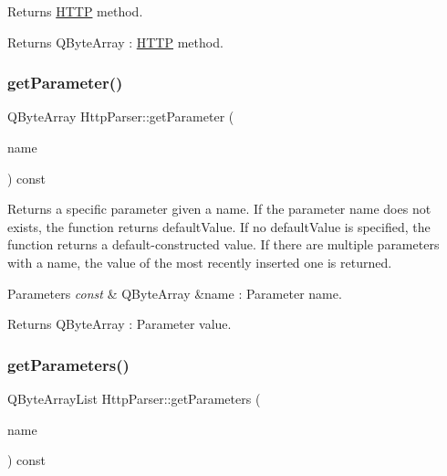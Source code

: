 Returns \hyperlink{namespace_h_t_t_p}{H\+T\+TP} method. 

\begin{DoxyReturn}{Returns}
Q\+Byte\+Array \+: \hyperlink{namespace_h_t_t_p}{H\+T\+TP} method. 
\end{DoxyReturn}
\mbox{\label{class_http_parser_a69fb981ff2f60058277c51b674006663}} 
\subsubsection{\texorpdfstring{get\+Parameter()}{getParameter()}}
{\footnotesize\ttfamily Q\+Byte\+Array Http\+Parser\+::get\+Parameter (\begin{DoxyParamCaption}\item[{const Q\+Byte\+Array \&}]{name }\end{DoxyParamCaption}) const}



Returns a specific parameter given a name. If the parameter name does not exists, the function returns default\+Value. If no default\+Value is specified, the function returns a default-\/constructed value. If there are multiple parameters with a name, the value of the most recently inserted one is returned. 


\begin{DoxyParams}{Parameters}
{\em const} & Q\+Byte\+Array \&name \+: Parameter name. \\
\hline
\end{DoxyParams}
\begin{DoxyReturn}{Returns}
Q\+Byte\+Array \+: Parameter value. 
\end{DoxyReturn}
\mbox{\label{class_http_parser_ab0bb302010df956a954fada3061f59f0}} 
\subsubsection{\texorpdfstring{get\+Parameters()}{getParameters()}\hspace{0.1cm}{\footnotesize\ttfamily [1/2]}}
{\footnotesize\ttfamily Q\+Byte\+Array\+List Http\+Parser\+::get\+Parameters (\begin{DoxyParamCaption}\item[{const Q\+Byte\+Array \&}]{name }\end{DoxyParamCaption}) const}



